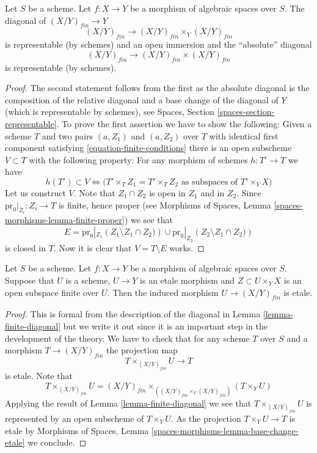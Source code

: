 \begin{lemma}
\label{lemma-finite-diagonal}
Let $S$ be a scheme.
Let $f : X \to Y$ be a morphism of algebraic spaces over $S$.
The diagonal of $(X/Y)_{fin} \to Y$
$$
(X/Y)_{fin} \longrightarrow (X/Y)_{fin} \times_Y (X/Y)_{fin}
$$
is representable (by schemes) and an open immersion and the ``absolute''
diagonal
$$
(X/Y)_{fin} \longrightarrow (X/Y)_{fin} \times (X/Y)_{fin}
$$
is representable (by schemes).
\end{lemma}

\begin{proof}
The second statement follows from the first as the absolute diagonal
is the composition of the relative diagonal and a base change
of the diagonal of $Y$ (which is representable by schemes), see
Spaces, Section \ref{spaces-section-representable}.
To prove the first assertion we have to show the following:
Given a scheme $T$ and two pairs $(a, Z_1)$ and $(a, Z_2)$ over $T$
with identical first component
satisfying \ref{equation-finite-conditions}
there is an open subscheme $V \subset T$ with the following
property: For any morphism of schemes $h : T' \to T$ we have
$$
h(T') \subset V \Leftrightarrow
\Big(T' \times_T Z_1 = T' \times_T Z_2
\text{ as subspaces of }T' \times_Y X\Big)
$$
Let us construct $V$. Note that $Z_1 \cap Z_2$ is open in $Z_1$
and in $Z_2$. Since $\text{pr}_0|_{Z_i} : Z_i \to T$ is finite,
hence proper (see
Morphisms of Spaces, Lemma \ref{spaces-morphisms-lemma-finite-proper})
we see that
$$
E =
\text{pr}_0|_{Z_1}\left(Z_1 \setminus Z_1 \cap Z_2)\right)
\cup
\text{pr}_0|_{Z_2}\left(Z_2 \setminus Z_1 \cap Z_2)\right)
$$
is closed in $T$. Now it is clear that $V = T \setminus E$ works.
\end{proof}

\begin{lemma}
\label{lemma-finite-criterion-etale}
Let $S$ be a scheme.
Let $f : X \to Y$ be a morphism of algebraic spaces over $S$.
Suppose that $U$ is a scheme, $U \to Y$ is an etale morphism and
$Z \subset U \times_Y X$ is an open subspace finite over $U$.
Then the induced morphism $U \to (X/Y)_{fin}$ is etale.
\end{lemma}

\begin{proof}
This is formal from the description of the diagonal in
Lemma \ref{lemma-finite-diagonal}
but we write it out since it is an important step in the development
of the theory. We have to check that for any scheme $T$ over $S$ and a morphism
$T \to (X/Y)_{fin}$ the projection map
$$
T \times_{(X/Y)_{fin}} U \longrightarrow T
$$
is etale. Note that
$$
T \times_{(X/Y)_{fin}} U
=
(X/Y)_{fin} \times_{((X/Y)_{fin} \times_Y (X/Y)_{fin})} (T \times_Y U)
$$
Applying the result of
Lemma \ref{lemma-finite-diagonal}
we see that $T \times_{(X/Y)_{fin}} U$ is represented by an open subscheme of
$T \times_Y U$. As the projection $T \times_Y U \to T$ is etale by
Morphisms of Spaces, Lemma \ref{spaces-morphisms-lemma-base-change-etale}
we conclude.
\end{proof}

